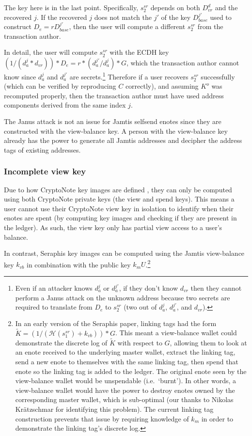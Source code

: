 The key here is in the last point. Specifically, $s^{sr}_2$ depends on both $D^d_{vr}$ and the recovered $j$. If the recovered $j$ does not match the $j'$ of the key $D^{j'}_{base}$ used to construct $D_e = r D^{j'}_{base}$, then the user will compute a different $s^{sr}_2$ from the transaction author.

In detail, the user will compute $s^{sr}_2$ with the ECDH key $(1/(d^j_a * d_{vr})) * D_e = r * (d^{j'}_a/d^{j}_a) * G$, which the transaction author cannot know since $d^{j}_a$ and $d^{j'}_a$ are secrets.\footnote{Even if an attacker knows $d^{j}_a$ or $d^{j'}_a$, if they don't know $d_{vr}$ then they cannot perform a Janus attack on the unknown address because two secrets are required to translate from $D_e$ to $s^{sr}_2$ (two out of $d^{j}_a$, $d^{j'}_a$, and $d_{vr}$).} Therefore if a user recovers $s^{sr}_2$ successfully (which can be verified by reproducing $C$ correctly), and assuming $K^o$ was recomputed properly, then the transaction author must have used address components derived from the same index $j$.

The Janus attack is not an issue for Jamtis selfsend enotes since they are constructed with the view-balance key. A person with the view-balance key already has the power to generate all Jamtis addresses and decipher the address tags of existing addresses.

\subsubsection{Incomplete view key}
\label{subsubsec:jamtis-cryptonote-flaws-view-key}

Due to how CryptoNote key images are defined \cite{cryptoNoteWhitePaper}, they can only be computed using both CryptoNote private keys (the view and spend keys). This means a user cannot use their CryptoNote view key in isolation to identify when their enotes are spent (by computing key images and checking if they are present in the ledger). As such, the view key only has partial view access to a user's balance.

In contrast, Seraphis key images can be computed using the Jamtis view-balance key $k_{vb}$ in combination with the public key $k_m U$.\footnote{In an early version of the Seraphis paper, linking tags had the form $\tilde{K} = (1/(\mathcal{H}(s^{sr}_1) + k_{vb}))*G$. This meant a view-balance wallet could demonstrate the discrete log of $\tilde{K}$ with respect to $G$, allowing them to look at an enote received to the underlying master wallet, extract the linking tag, send a new enote to themselves with the same linking tag, then spend that enote so the linking tag is added to the ledger. The original enote seen by the view-balance wallet would be unspendable (i.e.\ `burnt'). In other words, a view-balance wallet would have the power to destroy enotes owned by the corresponding master wallet, which is sub-optimal (our thanks to Nikolas Kr{\"{a}}tzschmar for identifying this problem). The current linking tag construction prevents that issue by requiring knowledge of $k_m$ in order to demonstrate the linking tag's discrete log.}



